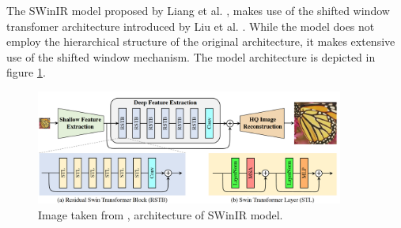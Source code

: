 The SWinIR model proposed by Liang et al. \cite{liangSwinIRImageRestoration2021a}, 
makes use of the shifted window transfomer architecture introduced by Liu et al. \cite{liangSwinIRImageRestoration2021a}.
While the model does not employ the hierarchical structure of the original architecture, 
it makes extensive use of the shifted window mechanism.
The model architecture is depicted in figure \ref{fig:swinir_model}.

\begin{figure}[h!]
    \includegraphics[width=0.9\textwidth]{models/sisr/imgs/swinir_model.png}
    \caption{Image taken from \cite{liangSwinIRImageRestoration2021a}, architecture of SWinIR model.}
    \label{fig:swinir_model}
\end{figure}